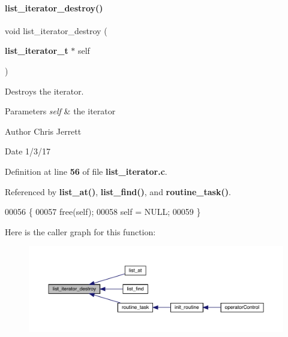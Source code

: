 \paragraph{list\+\_\+iterator\+\_\+destroy()}
{\footnotesize\ttfamily void list\+\_\+iterator\+\_\+destroy (\begin{DoxyParamCaption}\item[{\textbf{ list\+\_\+iterator\+\_\+t} $\ast$}]{self }\end{DoxyParamCaption})}



Destroys the iterator. 


\begin{DoxyParams}{Parameters}
{\em self} & the iterator \\
\hline
\end{DoxyParams}
\begin{DoxyAuthor}{Author}
Chris Jerrett 
\end{DoxyAuthor}
\begin{DoxyDate}{Date}
1/3/17 
\end{DoxyDate}


Definition at line \textbf{ 56} of file \textbf{ list\+\_\+iterator.\+c}.



Referenced by \textbf{ list\+\_\+at()}, \textbf{ list\+\_\+find()}, and \textbf{ routine\+\_\+task()}.


\begin{DoxyCode}
00056                                                   \{
00057   free(\textcolor{keyword}{self});
00058   \textcolor{keyword}{self} = NULL;
00059 \}
\end{DoxyCode}
Here is the caller graph for this function\+:\nopagebreak
\begin{figure}[H]
\begin{center}
\leavevmode
\includegraphics[width=350pt]{list__iterator_8c_ad16fa29ddbb444070ea65f871e1c0ba2_icgraph}
\end{center}
\end{figure}
\mbox{\label{list__iterator_8c_a3c956afda343b4a6aaf68fbd4b446733}} 
